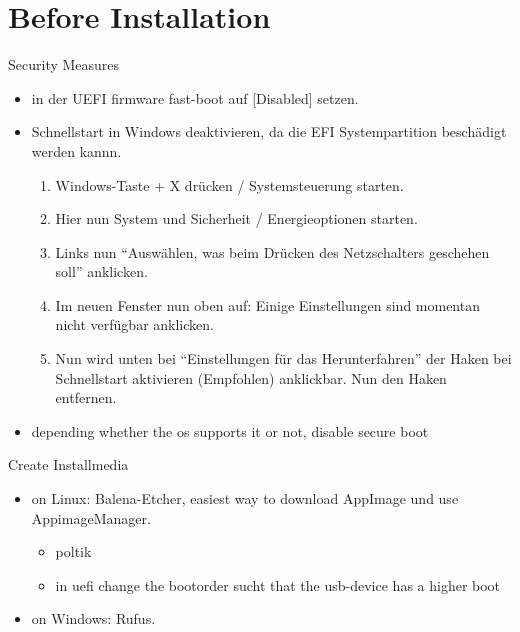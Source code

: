 
\section{Before Installation}

\begin{frame}{Security Measures}
  \begin{itemize}
    \item in der UEFI firmware \alert{fast-boot} auf [Disabled] setzen.
    \item \alert{Schnellstart} in Windows deaktivieren, da die EFI Systempartition beschädigt werden kannn.
      \begin{enumerate}
        \item Windows-Taste + X drücken / Systemsteuerung starten.
        \item Hier nun System und Sicherheit / Energieoptionen starten.
        \item Links nun \enquote{Auswählen, was beim Drücken des Netzschalters geschehen soll} anklicken.
        \item Im neuen Fenster nun oben auf: Einige Einstellungen sind momentan nicht verfügbar anklicken.
        \item Nun wird unten bei \enquote{Einstellungen für das Herunterfahren} der Haken bei \alert{Schnellstart aktivieren} (Empfohlen) anklickbar. Nun den Haken entfernen.
      \end{enumerate}
    \item depending whether the os supports it or not, disable \alert{secure boot}
  \end{itemize}
\end{frame}

\begin{frame}{Create Installmedia}
  \begin{itemize}
    \item \alert{on Linux:} Balena-Etcher, easiest way to download AppImage und use AppimageManager.
      \begin{itemize}
        \item poltik
        \item in uefi change the bootorder sucht that the usb-device has a higher boot
      \end{itemize}
    \item \alert{on Windows:} Rufus.
  \end{itemize}
\end{frame}

